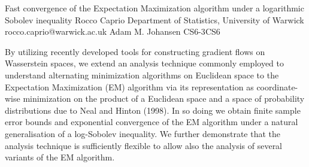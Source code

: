 \begin{talk}
  {Fast convergence of the Expectation Maximization algorithm under a logarithmic Sobolev inequality}%
  {Rocco Caprio}%
  {Department of Statistics, University of Warwick}%
  {rocco.caprio@warwick.ac.uk}%
  {Adam M. Johansen}%
{}{}{CS6-3}{CS6}


By utilizing recently developed tools for constructing gradient flows on Wasserstein spaces, we extend an analysis technique commonly employed to understand alternating minimization algorithms on Euclidean space to the Expectation Maximization (EM) algorithm via its representation as coordinate-wise minimization on the product of a Euclidean space and a space of probability distributions due to Neal and Hinton (1998). In so doing we obtain finite sample error bounds and exponential convergence of the EM algorithm under a natural generalisation of a log-Sobolev inequality. We further demonstrate that the analysis technique is sufficiently flexible to allow also the analysis of several variants of the EM algorithm.
			


\end{talk}

